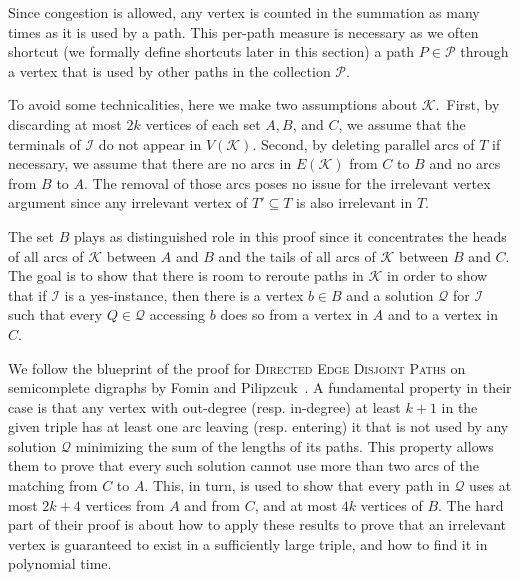 \documentclass[a4paper,UKenglish,cleveref, autoref, thm-restate]{lipics-v2021}
\begin{document}
Since congestion is allowed, any vertex is counted in the summation as many
times as it is used by a path.
This per-path measure is necessary as we often shortcut (we formally define shortcuts
later in this section) a path $P \in \mathcal{P}$ through a vertex that is used by other
paths in the collection
$\mathcal{P}$.

To avoid some technicalities, here we make two assumptions about $\mathcal{K}$.\
First, by discarding at most $2k$ vertices of each set $A, B$, and $C$, we assume that the terminals of $\mathcal{I}$ do not appear in $V(\mathcal{K})$.
Second, by deleting parallel arcs of $T$ if necessary, we assume that there are no arcs in $E(\mathcal{K})$ from $C$ to $B$ and no arcs from $B$ to $A$.
The removal of those arcs poses no issue for the irrelevant vertex argument since any irrelevant vertex of $T' \subseteq T$ is also irrelevant in $T$.

The set $B$ plays as distinguished role in this proof since it concentrates the heads of all arcs of $\mathcal{K}$ between $A$ and $B$ and the tails of all arcs of $\mathcal{K}$ between $B$ and $C$.
The goal is to show that there is room to reroute paths in $\mathcal{K}$ in order to show that if $\mathcal{I}$ is a  {\sf yes}-instance, then there is a vertex $b \in B$ and a solution $\mathcal{Q}$ for $\mathcal{I}$ such that every $Q \in \mathcal{Q}$ accessing $b$ does so from a vertex in $A$ and to a vertex in $C$.




We follow the blueprint of the proof for \textsc{Directed Edge Disjoint Paths} on semicomplete
digraphs by Fomin and Pilipzcuk~\cite{FominP19}.
A fundamental property in their case is that any vertex with out-degree (resp. in-degree) at
least $k+1$ in the given triple has at least one arc leaving (resp. entering) it that is not
used by any solution $\mathcal{Q}$ minimizing the sum of the lengths of its paths.
This property allows them to prove that every such solution cannot use more than
two arcs of the matching from $C$ to $A$.
This, in turn, is used to show that every path in $\mathcal{Q}$ uses at most $2k+4$ vertices from
$A$ and from $C$, and at most $4k$ vertices of $B$.
The hard part of their proof is about how to apply these results to prove that an irrelevant
vertex is guaranteed to exist in a sufficiently large triple, and how to find it in polynomial time.
\end{document}
